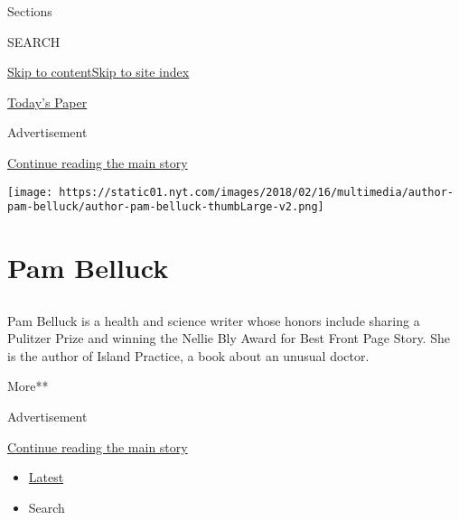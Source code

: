 Sections

SEARCH

\protect\hyperlink{site-content}{Skip to
content}\protect\hyperlink{site-index}{Skip to site index}

\href{https://myaccount.nytimes.com/auth/login?response_type=cookie\&client_id=vi}{}

\href{https://www.nytimes.com/section/todayspaper}{Today's Paper}

Advertisement

\protect\hyperlink{after-top}{Continue reading the main story}

\texttt{[image: https://static01.nyt.com/images/2018/02/16/multimedia/author-pam-belluck/author-pam-belluck-thumbLarge-v2.png]}

\hypertarget{pam-belluck}{%
\section{Pam Belluck}\label{pam-belluck}}

\subsection{}

Pam Belluck is a health and science writer whose honors include sharing
a Pulitzer Prize and winning the Nellie Bly Award for Best Front Page
Story. She is the author of Island Practice, a book about an unusual
doctor.

More**

Advertisement

\protect\hyperlink{after-mid1}{Continue reading the main story}

\begin{itemize}
\tightlist
\item
  \protect\hyperlink{stream-panel}{Latest}
\item
  Search
\end{itemize}

